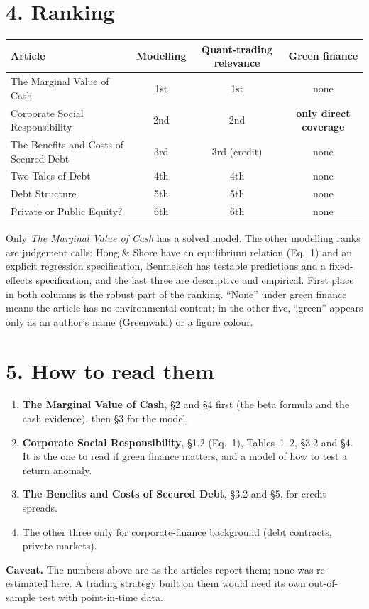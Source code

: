 \documentclass[11pt,a4paper]{article}
\begin{document}
\section*{4. Ranking}
\begin{center}\small
\begin{tabular}{@{}lccc@{}}
  \toprule
  Article & Modelling & Quant-trading relevance & Green finance \\ \midrule
  The Marginal Value of Cash & 1st & 1st & none \\
  Corporate Social Responsibility & 2nd & 2nd & \textbf{only direct coverage} \\
  The Benefits and Costs of Secured Debt & 3rd & 3rd (credit) & none \\
  Two Tales of Debt & 4th & 4th & none \\
  Debt Structure & 5th & 5th & none \\
  Private or Public Equity? & 6th & 6th & none \\ \bottomrule
\end{tabular}
\end{center}
\noindent Only \emph{The Marginal Value of Cash} has a solved model. The other modelling ranks are
judgement calls: Hong \& Shore have an equilibrium relation (Eq.~1) and an explicit regression
specification, Benmelech has testable predictions and a fixed-effects specification, and the last three
are descriptive and empirical. First place in both columns is the robust part of the ranking. ``None''
under green finance means the article has no environmental content; in the other five, ``green'' appears
only as an author's name (Greenwald) or a figure colour.

\section*{5. How to read them}
\begin{enumerate}[leftmargin=1.4em]
  \item \textbf{The Marginal Value of Cash}, §2 and §4 first (the beta formula and the cash evidence),
        then §3 for the model.
  \item \textbf{Corporate Social Responsibility}, §1.2 (Eq.~1), Tables~1--2, §3.2 and §4. It is the one
        to read if green finance matters, and a model of how to test a return anomaly.
  \item \textbf{The Benefits and Costs of Secured Debt}, §3.2 and §5, for credit spreads.
  \item The other three only for corporate-finance background (debt contracts, private markets).
\end{enumerate}

\noindent\textbf{Caveat.} The numbers above are as the articles report them; none was re-estimated here.
A trading strategy built on them would need its own out-of-sample test with point-in-time data.
\end{document}
